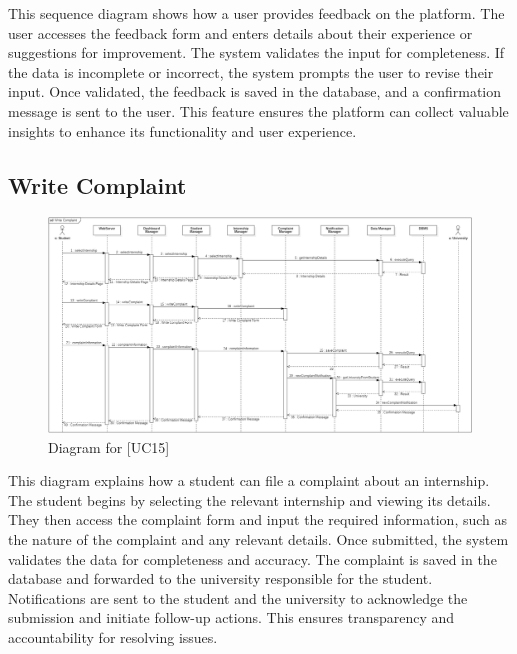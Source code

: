 This sequence diagram shows how a user provides feedback on the platform. The user accesses the feedback form and enters details about their experience or suggestions for improvement. The system validates the input for completeness. If the data is incomplete or incorrect, the system prompts the user to revise their input. Once validated, the feedback is saved in the database, and a confirmation message is sent to the user. This feature ensures the platform can collect valuable insights to enhance its functionality and user experience.

\subsection{Write Complaint}
\begin{figure} [H]
    \centering
    \includegraphics[width=1\linewidth]{DD/Images/Runtime Sequence Diagram Images/write_complaint.png}
    \caption{Diagram for [UC15]}
    \label{fig: Write Complaint Diagram}
\end{figure}

This diagram explains how a student can file a complaint about an internship. The student begins by selecting the relevant internship and viewing its details. They then access the complaint form and input the required information, such as the nature of the complaint and any relevant details. Once submitted, the system validates the data for completeness and accuracy. The complaint is saved in the database and forwarded to the university responsible for the student. Notifications are sent to the student and the university to acknowledge the submission and initiate follow-up actions. This ensures transparency and accountability for resolving issues.

